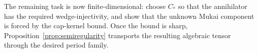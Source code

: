The remaining task is now finite-dimensional: choose \(C_*\) so that
the annihilator has the required wedge-injectivity, and show that the
unknown Mukai component is forced by the cap-kernel bound.  Once the
bound is sharp, Proposition~\ref{prop:semiregularity} transports the
resulting algebraic tensor through the desired period family.
